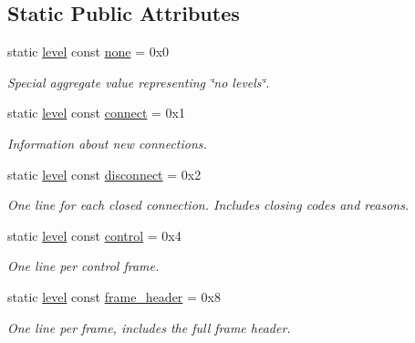 \subsection*{Static Public Attributes}
\begin{DoxyCompactItemize}
\item 
static \hyperlink{namespacewebsocketpp_1_1log_a12d4d17939f102db8c9183d400a41960}{level} const \hyperlink{structwebsocketpp_1_1log_1_1alevel_a4cf0520816094999975fe73081cf30f2}{none} = 0x0
\begin{DoxyCompactList}\small\item\em Special aggregate value representing \char`\"{}no levels\char`\"{}. \end{DoxyCompactList}\item 
static \hyperlink{namespacewebsocketpp_1_1log_a12d4d17939f102db8c9183d400a41960}{level} const \hyperlink{structwebsocketpp_1_1log_1_1alevel_aac3e16b6df297567ba2533233d477d57}{connect} = 0x1
\begin{DoxyCompactList}\small\item\em Information about new connections. \end{DoxyCompactList}\item 
static \hyperlink{namespacewebsocketpp_1_1log_a12d4d17939f102db8c9183d400a41960}{level} const \hyperlink{structwebsocketpp_1_1log_1_1alevel_af19681d3edb28e0407688eeda8f0005c}{disconnect} = 0x2
\begin{DoxyCompactList}\small\item\em One line for each closed connection. Includes closing codes and reasons. \end{DoxyCompactList}\item 
static \hyperlink{namespacewebsocketpp_1_1log_a12d4d17939f102db8c9183d400a41960}{level} const \hyperlink{structwebsocketpp_1_1log_1_1alevel_ae67e6466bf3d9daf45cc865e8d48f445}{control} = 0x4
\begin{DoxyCompactList}\small\item\em One line per control frame. \end{DoxyCompactList}\item 
static \hyperlink{namespacewebsocketpp_1_1log_a12d4d17939f102db8c9183d400a41960}{level} const \hyperlink{structwebsocketpp_1_1log_1_1alevel_ac25fc7cb5fc229abb6fc893f16ffb678}{frame\+\_\+header} = 0x8
\begin{DoxyCompactList}\small\item\em One line per frame, includes the full frame header. \end{DoxyCompactList}\item 

\end{DoxyCompactItemize}
